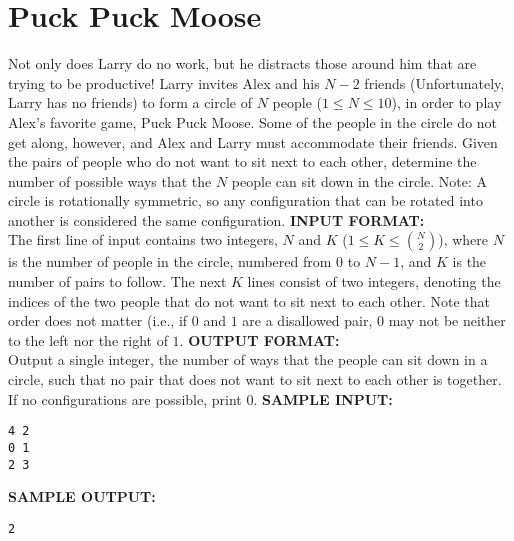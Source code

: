 \documentclass{article}
\begin{document}
\newcommand{\blank}{\vskip 3mm}
\setlength\parindent{0pt}
\renewcommand\thesection{\Alph{section}}

\setcounter{section}{4}
\section{Puck Puck Moose}

Not only does Larry do no work, but he distracts those around him that are trying to be productive! Larry invites Alex and his $ N - 2 $ friends (Unfortunately, Larry has no friends) to form a circle of $ N $ people ($ 1 \leq N \leq 10 $), in order to play Alex's favorite game, Puck Puck Moose.  Some of the people in the circle do not get along, however, and Alex and Larry must accommodate their friends.  Given the pairs of people who do not want to sit next to each other, determine the number of possible ways that the $ N $ people can sit down in the circle.
\blank
Note: A circle is rotationally symmetric, so any configuration that can be rotated into another is considered the same configuration.
\blank
\textbf{INPUT FORMAT:}\\
The first line of input contains two integers, $ N $ and $ K $ ($ 1 \leq K \leq {{N}\choose{2}} $), where $ N $ is the number of people in the circle, numbered from $ 0 $ to $ N - 1 $, and $ K $ is the number of pairs to follow. The next $ K $ lines consist of two integers, denoting the indices of the two people that do not want to sit next to each other.  Note that order does not matter (i.e., if $ 0 $ and $ 1 $ are a disallowed pair, $ 0 $ may not be neither to the left nor the right of $ 1 $.
\blank
\textbf{OUTPUT FORMAT:}\\
Output a single integer, the number of ways that the people can sit down in a circle, such that no pair that does not want to sit next to each other is together.  If no configurations are possible, print $ 0 $.
\blank
\textbf{SAMPLE INPUT:}
\begin{verbatim}
4 2
0 1
2 3
\end{verbatim}
\textbf{SAMPLE OUTPUT:}
\begin{verbatim}
2
\end{verbatim}
\end{document}
